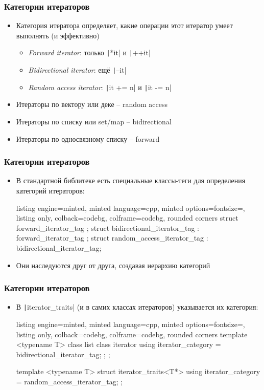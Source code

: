 \documentclass[10pt]{beamer}
\begin{document}
\begin{frame}[fragile]
\frametitle{Категории итераторов}
\begin{itemize}
\item Категория итератора определяет, какие операции этот итератор умеет выполнять (и эффективно)
\pause
\begin{itemize}
\item \textit{Forward iterator}: только \texttt|*it| и \texttt|++it|
\pause
\item \textit{Bidirectional iterator}: ещё \texttt|--it|
\pause
\item \textit{Random access iterator}: \texttt|it += n| и \texttt|it -= n|
\end{itemize}
\pause
\item Итераторы по вектору или деке -- random access
\pause
\item Итераторы по списку или set/map -- bidirectional
\pause
\item Итераторы по односвязному списку -- forward
\end{itemize}
\end{frame}

\begin{frame}[fragile]
\frametitle{Категории итераторов}
\begin{itemize}
\item В стандартной библитеке есть специальные классы-теги для определения категорий итераторов:
\begin{tcblisting}{listing engine=minted, minted language=cpp, minted options={fontsize=\scriptsize}, listing only, colback=codebg, colframe=codebg, rounded corners}
struct forward_iterator_tag {};
struct bidirectional_iterator_tag : forward_iterator_tag {};
struct random_access_iterator_tag : bidirectional_iterator_tag{};
\end{tcblisting}
\pause
{}
\item Они наследуются друг от друга, создавая иерархию категорий
\end{itemize}
\end{frame}

\begin{frame}[fragile]
\frametitle{Категории итераторов}
\begin{itemize}
\item В \texttt|iterator_traits| (и в самих классах итераторов) указывается их категория:
\begin{tcblisting}{listing engine=minted, minted language=cpp, minted options={fontsize=\scriptsize}, listing only, colback=codebg, colframe=codebg, rounded corners}
template <typename T>
class list {
  class iterator {
    using iterator_category = bidirectional_iterator_tag;
  };
};

template <typename T>
struct iterator_traits<T*> {
  using iterator_category = random_access_iterator_tag;
};
\end{tcblisting}
\end{itemize}
\end{frame}
\end{document}
